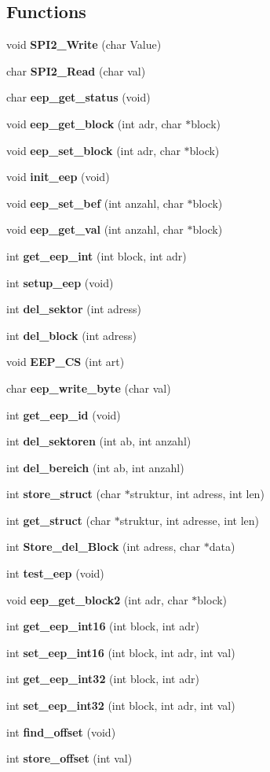 \subsection*{Functions}
\begin{DoxyCompactItemize}
\item 
void \textbf{ S\+P\+I2\+\_\+\+Write} (char Value)
\item 
char \textbf{ S\+P\+I2\+\_\+\+Read} (char val)
\item 
char \textbf{ eep\+\_\+get\+\_\+status} (void)
\item 
void \textbf{ eep\+\_\+get\+\_\+block} (int adr, char $\ast$block)
\item 
void \textbf{ eep\+\_\+set\+\_\+block} (int adr, char $\ast$block)
\item 
void \textbf{ init\+\_\+eep} (void)
\item 
void \textbf{ eep\+\_\+set\+\_\+bef} (int anzahl, char $\ast$block)
\item 
void \textbf{ eep\+\_\+get\+\_\+val} (int anzahl, char $\ast$block)
\item 
int \textbf{ get\+\_\+eep\+\_\+int} (int block, int adr)
\item 
int \textbf{ setup\+\_\+eep} (void)
\item 
int \textbf{ del\+\_\+sektor} (int adress)
\item 
int \textbf{ del\+\_\+block} (int adress)
\item 
void \textbf{ E\+E\+P\+\_\+\+CS} (int art)
\item 
char \textbf{ eep\+\_\+write\+\_\+byte} (char val)
\item 
int \textbf{ get\+\_\+eep\+\_\+id} (void)
\item 
int \textbf{ del\+\_\+sektoren} (int ab, int anzahl)
\item 
int \textbf{ del\+\_\+bereich} (int ab, int anzahl)
\item 
int \textbf{ store\+\_\+struct} (char $\ast$struktur, int adress, int len)
\item 
int \textbf{ get\+\_\+struct} (char $\ast$struktur, int adresse, int len)
\item 
int \textbf{ Store\+\_\+del\+\_\+\+Block} (int adress, char $\ast$data)
\item 
int \textbf{ test\+\_\+eep} (void)
\item 
void \textbf{ eep\+\_\+get\+\_\+block2} (int adr, char $\ast$block)
\item 
int \textbf{ get\+\_\+eep\+\_\+int16} (int block, int adr)
\item 
int \textbf{ set\+\_\+eep\+\_\+int16} (int block, int adr, int val)
\item 
int \textbf{ get\+\_\+eep\+\_\+int32} (int block, int adr)
\item 
int \textbf{ set\+\_\+eep\+\_\+int32} (int block, int adr, int val)
\item 
int \textbf{ find\+\_\+offset} (void)
\item 
int \textbf{ store\+\_\+offset} (int val)
\end{DoxyCompactItemize}

